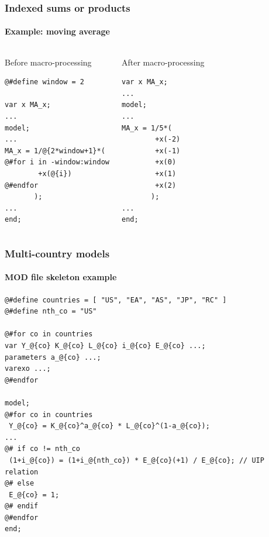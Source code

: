 \documentclass{beamer}
\begin{document}
\begin{frame}[fragile=singleslide]
  \frametitle{Indexed sums or products}
  \framesubtitle{Example: moving average}
  \begin{columns}[T]
    \begin{block}{Before macro-processing}
\begin{verbatim}
@#define window = 2

var x MA_x;
...
model;
...
MA_x = 1/@{2*window+1}*(
@#for i in -window:window
        +x(@{i})
@#endfor
       );
...
end;
\end{verbatim}
    \end{block}
    \begin{block}{After macro-processing}
\begin{verbatim}
var x MA_x;
...
model;
...
MA_x = 1/5*(
        +x(-2)
        +x(-1)
        +x(0)
        +x(1)
        +x(2)
       );
...
end;
\end{verbatim}
    \end{block}
  \end{columns}
\end{frame}

\begin{frame}[fragile=singleslide]
  \frametitle{Multi-country models}
  \framesubtitle{MOD file skeleton example}
  \scriptsize
\begin{verbatim}
@#define countries = [ "US", "EA", "AS", "JP", "RC" ]
@#define nth_co = "US"

@#for co in countries
var Y_@{co} K_@{co} L_@{co} i_@{co} E_@{co} ...;
parameters a_@{co} ...;
varexo ...;
@#endfor

model;
@#for co in countries
 Y_@{co} = K_@{co}^a_@{co} * L_@{co}^(1-a_@{co});
...
@# if co != nth_co
 (1+i_@{co}) = (1+i_@{nth_co}) * E_@{co}(+1) / E_@{co}; // UIP relation
@# else
 E_@{co} = 1;
@# endif
@#endfor
end;
\end{verbatim}
  \normalsize
\end{frame}
\end{document}
